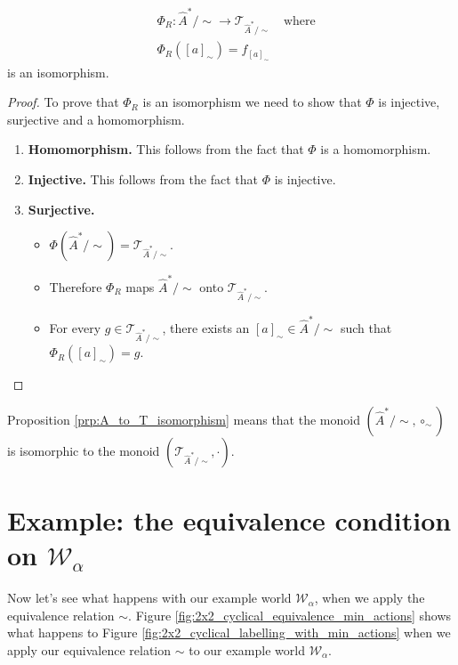\begin{proposition}\label{prp:A_to_T_isomorphism}
	\begin{equation}
		\begin{aligned}
			 & \Phi_{R} : \hat{A}^{\ast}/\sim \to \mathcal{T}_{\hat{A}^{\ast}/\sim} \quad \text{where} \\
			 & \Phi_{R}([a]_{\sim}) = f_{[a]_{\sim}}
		\end{aligned}
	\end{equation}
	is an isomorphism.
\end{proposition}
\begin{proof}
	To prove that $\Phi_{R}$ is an isomorphism we need to show that $\Phi$ is injective, surjective and a homomorphism.
	\begin{enumerate}
		\item \textbf{Homomorphism.}
		      This follows from the fact that $\Phi$ is a homomorphism.

		\item \textbf{Injective.}
		      This follows from the fact that $\Phi$ is injective.

		\item \textbf{Surjective.}
		      \begin{itemize}
			      \item $\Phi(\hat{A}^{\ast}/\sim) = \mathcal{T}_{\hat{A}^{\ast}/\sim}$.
			      \item Therefore $\Phi_{R}$ maps $\hat{A}^{\ast}/\sim$ onto $\mathcal{T}_{\hat{A}^{\ast}/\sim}$.
			      \item For every $g \in \mathcal{T}_{\hat{A}^{\ast}/\sim}$, there exists an $[a]_{\sim} \in \hat{A}^{\ast}/\sim$ such that $\Phi_{R}([a]_{\sim}) = g$.
		      \end{itemize}
	\end{enumerate}
\end{proof}

Proposition \ref{prp:A_to_T_isomorphism} means that the monoid $(\hat{A}^{\ast}/\sim, \circ_{\sim})$ is isomorphic to the monoid $(\mathcal{T}_{\hat{A}^{\ast}/\sim}, \cdot)$.


\section{
  Example: the equivalence condition on \texorpdfstring{$\mathscr{W}_{\alpha}$}{example world}
 }\label{sec:the_equivalence_condition_on_example_world}

Now let's see what happens with our example world $\mathscr{W}_{\alpha}$, when we apply the equivalence relation $\sim$.
Figure \ref{fig:2x2_cyclical_equivalence_min_actions} shows what happens to Figure \ref{fig:2x2_cyclical_labelling_with_min_actions} when we apply our equivalence relation $\sim$ to our example world $\mathscr{W}_{\alpha}$.

